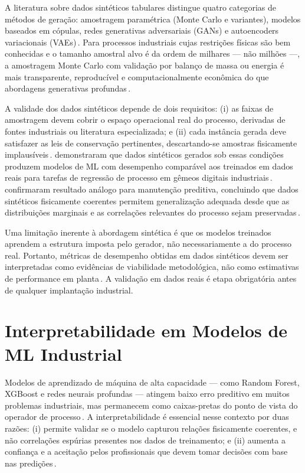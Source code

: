 A literatura sobre dados sintéticos tabulares distingue quatro categorias de métodos de geração: amostragem paramétrica (Monte Carlo e variantes), modelos baseados em cópulas, redes generativas adversariais (GANs) e autoencoders variacionais (VAEs)\,\cite{buggineni2024synthetic,melo2024synthetic}. Para processos industriais cujas restrições físicas são bem conhecidas e o tamanho amostral alvo é da ordem de milhares — não milhões —, a amostragem Monte Carlo com validação por balanço de massa ou energia é mais transparente, reproducível e computacionalmente econômica do que abordagens generativas profundas\,\cite{buggineni2024synthetic,morales2025synthetic}.

A validade dos dados sintéticos depende de dois requisitos: (i) as faixas de amostragem devem cobrir o espaço operacional real do processo, derivadas de fontes industriais ou literatura especializada; e (ii) cada instância gerada deve satisfazer as leis de conservação pertinentes, descartando-se amostras fisicamente implausíveis\,\cite{buggineni2024synthetic,melo2024synthetic}. \citeauthor{melo2024synthetic} demonstraram que dados sintéticos gerados sob essas condições produzem modelos de ML com desempenho comparável aos treinados em dados reais para tarefas de regressão de processo em gêmeos digitais industriais\,\cite{melo2024synthetic}. \citeauthor{morales2025synthetic} confirmaram resultado análogo para manutenção preditiva, concluindo que dados sintéticos fisicamente coerentes permitem generalização adequada desde que as distribuições marginais e as correlações relevantes do processo sejam preservadas\,\cite{morales2025synthetic}.

Uma limitação inerente à abordagem sintética é que os modelos treinados aprendem a estrutura imposta pelo gerador, não necessariamente a do processo real. Portanto, métricas de desempenho obtidas em dados sintéticos devem ser interpretadas como evidências de viabilidade metodológica, não como estimativas de performance em planta\,\cite{giannini2022synthetic}. A validação em dados reais é etapa obrigatória antes de qualquer implantação industrial.

\section{Interpretabilidade em Modelos de ML Industrial}
\label{sec:interpretabilidade}

Modelos de aprendizado de máquina de alta capacidade — como Random Forest, XGBoost e redes neurais profundas — atingem baixo erro preditivo em muitos problemas industriais, mas permanecem como caixas-pretas do ponto de vista do operador de processo\,\cite{inglis2022visualisation}. A interpretabilidade é essencial nesse contexto por duas razões: (i) permite validar se o modelo capturou relações fisicamente coerentes, e não correlações espúrias presentes nos dados de treinamento; e (ii) aumenta a confiança e a aceitação pelos profissionais que devem tomar decisões com base nas predições\,\cite{inglis2022visualisation,manojlovic2022eaf}.

